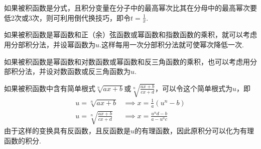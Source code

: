 \begin{example}
如果被积函数是分式，且积分变量在分子中的最高幂次比其在分母中的最高幂次要低2次或3次，则可利用倒代换技巧，即令\(t=\frac{1}{x}\).
\end{example}

\begin{example}
如果被积函数是幂函数和正（余）弦函数或幂函数和指数函数的乘积，就可以考虑用分部积分法，并设幂函数为\(u\).这样每用一次分部积分法就可使幂次降低一次.

如果被积函数是幂函数和对数函数或幂函数和反三角函数的乘积，也可以考虑用分部积分法，并设对数函数或反三角函数为\(u\).
\end{example}

\begin{example}
如果被积函数中含有简单根式\(\sqrt[n]{ax+b}\)或\(\sqrt[n]{\frac{ax+b}{cx+d}}\)，可以令这个简单根式为\(u\)，即\begin{align*}
u=\sqrt[n]{ax+b} &\implies x=\frac{1}{a}(u^n-b) \\
u=\sqrt[n]{\frac{ax+b}{cx+d}} &\implies x=\frac{u^nd-b}{a-u^nc}
\end{align*}由于这样的变换具有反函数，且反函数是\(u\)的有理函数，因此原积分可以化为有理函数的积分.
\end{example}
